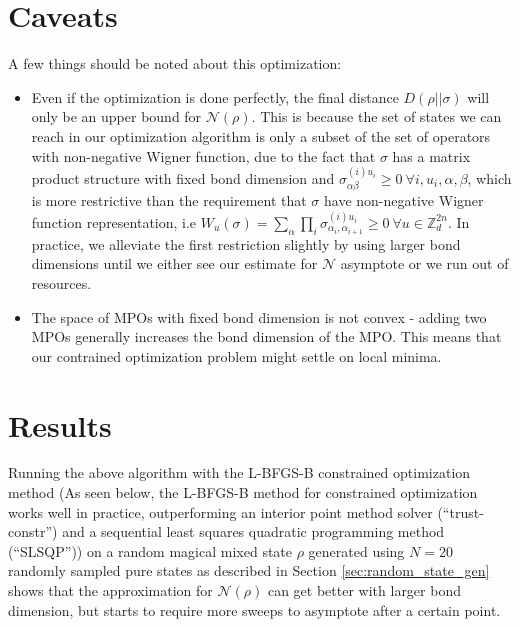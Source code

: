 \documentclass{article}
\begin{document}
\section{Caveats}

A few things should be noted about this optimization:

\begin{itemize}
	\item Even if the optimization is done perfectly, the final distance $D(\rho||\sigma)$ will only be an upper bound for $\mathcal N(\rho)$. This is because the set of states we can reach in our optimization algorithm is only a subset of the set of operators with non-negative Wigner function, due to the fact that $\sigma$ has a matrix product structure with fixed bond dimension and $\sigma^{(i)u_i}_{\alpha\beta}\geq 0\ \forall i,u_i,\alpha,\beta$, which is more restrictive than the requirement that $\sigma$ have non-negative Wigner function representation, i.e $W_u(\sigma)=\sum_\alpha \prod_i \sigma^{(i)u_i}_{\alpha_i,\alpha_{i+1}}\geq 0\ \forall u\in \mathbb Z_d^{2n}$. In practice, we alleviate the first restriction slightly by using larger bond dimensions until we either see our estimate for $\mathcal N$ asymptote or we run out of resources.
	\item The space of MPOs with fixed bond dimension is not convex - adding two MPOs generally increases the bond dimension of the MPO. This means that our contrained optimization problem might settle on local minima. 
\end{itemize}

\pagebreak

\section{Results}

Running the above algorithm with the L-BFGS-B constrained optimization method (As seen below, the L-BFGS-B method \cite{bfgs,bfgs_large_scale} for constrained optimization works well in practice, outperforming an interior point method solver (``trust-constr'') and a sequential least squares quadratic programming method (``SLSQP'')) on a random magical mixed state $\rho$ generated using $N=20$ randomly sampled pure states as described in Section \ref{sec:random_state_gen} shows that the approximation for $\mathcal N(\rho)$ can get better with larger bond dimension, but starts to require more sweeps to asymptote after a certain point.
\end{document}
